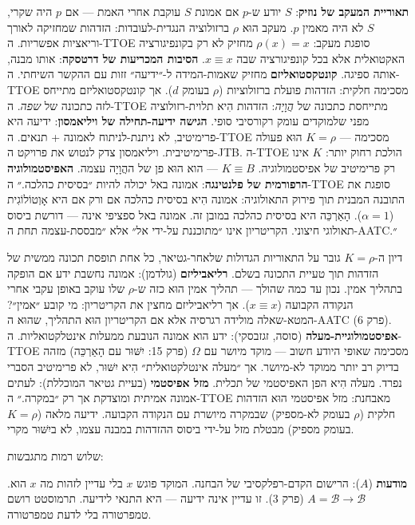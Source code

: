 \documentclass[10pt, openany, oneside]{book}
\begin{document}
\textbf{תאוריית המעקב של נוזיק}: $S$ יודע ש-$p$ אם אמונת $S$ עוקבת אחרי האמת — אם $p$ היה שקרי, $S$ לא היה מאמין $p$. מעקב הוּא $\rho$ ברזולוציה הנגדית-לעובדות: הזדהות שמחזיקה לאורך וריאציות אפשריות. ה-TTOE סופגת מעקב: $\rho(x) = x$ מחזיק לא רק בקונפיגורציה האקטואלית אלא בכל קונפיגורציה שבה $x \equiv x$. \textbf{הסיבות המכריעות של דרטסקה}: אותו מבנה, אותה ספיגה. \textbf{קונטקסטואליזם} מחזיק שאמות-המידה ל-״ידיעה״ זזות עם ההקשר השיחתי. ה-TTOE מסכימה חלקית: הזדהות פועלת ברזולוציות ($\rho$ בעומק $d$). אך קונטקסטואליזם מתייחס לזה כתכונה של \textit{שפה}. ה-TTOE מתייחסת כתכונה של \textit{הֲוָיָה}: הזדהות הִיא תלוית-רזולוציה מפני שלמוקדים עומק רקורסיבי סופי. \textbf{הגישה ידיעה-תחילה של ויליאמסון}: ידיעה היא פרימיטיב, לא ניתנת-לניתוח לאמונה + תנאים. ה-TTOE מסכימה — $K = \rho$ הוּא פעולה פרימיטיבית. ויליאמסון צדק לנטוש את פרויקט ה-JTB. ה-TTOE הולכת רחוק יותר: $K$ אינו רק פרימיטיב של אפיסטמולוגיה. $K \equiv B$ — הוא הוּא פן של ההֲוָיָה עצמה. \textbf{האפיסטמולוגיה הרפורמית של פלנטינגה}: אמונה באל יכולה להיות ״בסיסית כהלכה.״ ה-TTOE סופגת את התובנה המבנית תוך פירוק התאולוגיה: אמונה הִיא בסיסית כהלכה אם ורק אם היא אָוְטוֹלוֹגִית ($\alpha = 1$). הָאַרְכֵּה היא בסיסית כהלכה במובן זה. אמונה באל ספציפי אינה — דורשת ביסוס תאולוגי חיצוני. הקריטריון אינו ״מתוכננת על-ידי אל״ אלא ״מבססת-עצמה תחת ה-AATC.״

דיון ה-$K = \rho$ גובר על התאוריות הגדולות שלאחר-גטיאר, כל אחת תופסת תכונה ממשית של הזדהות תוך טעיית התכונה בשלם. \textbf{רליאביליזם} (גולדמן): אמונה נחשבת ידע אם הופקה בתהליך אמין. נכון עד כמה שהולך — תהליך אמין הוּא כזה ש-$\rho$ שלו עוקב באופן עקבי אחרי הנקודה הקבועה ($x \equiv x$). אך רליאביליזם מחצין את הקריטריון: מי קובע ״אמין״? המטא-שאלה מולידה רגרסיה אלא אם הקריטריון הוּא התהליך, שהוּא ה-AATC (פרק 6). \textbf{אפיסטמולוגיית-מעלה} (סוסה, זגזבסקי): ידע הוא אמונה הנובעת ממעלות אינטלקטואליות. ה-TTOE מסכימה שאופי היודע חשוב — מוקד מיושר עם $\Omega$ (פרק 15: יִשּׁוּר עם הָאַרְכֵּה) מזהה בדיוק רב יותר ממוקד לא-מיושר. אך ״מעלה אינטלקטואלית״ הִיא יִשּׁוּר, לא פרימיטיב הסברי נפרד. מעלה הִיא הפן האפיסטמי של תכלית. \textbf{מזל אפיסטמי} (בעיית גטיאר המוכללת): לעתים אמונה אמיתית ומוצדקת אך רק ״במקרה.״ ה-TTOE מאבחנת: מזל אפיסטמי הוּא הזדהות חלקית ($\rho$ בעומק לא-מספיק) שבמקרה מיושרת עם הנקודה הקבועה. ידיעה מלאה ($K = \rho$ בעומק מספיק) מבטלת מזל על-ידי ביסוס ההזדהות במבנה עצמו, לא ביִשּׁוּר מקרי.

שלוש רמות מתגבשות:

\textbf{מודעות} ($A$): הרישום הקדם-רפלקסיבי של הבחנה. המוקד פוגש $x$ בלי עדיין לזהות מה $x$ הוא. $A = \mathcal{B} \to \mathcal{B}$ (פרק 3). זו עדיין אינה ידיעה — היא התנאי לידיעה. תרמוסטט רושם טמפרטורה בלי לדעת טמפרטורה.
\end{document}
